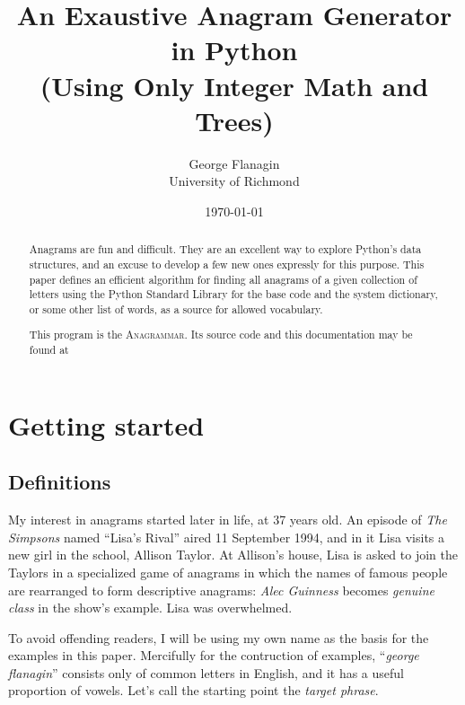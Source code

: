 \documentclass[letterpaper, 11pt]{article}
\title{An Exaustive Anagram Generator in Python\\
\Large \vspace{0.7em} (Using Only Integer Math and Trees)}
\author{George Flanagin\\University of Richmond\\\lit{gflanagin@richmond.edu}}
\date{\today}
\providecommand{\anagrammar}{A\textsc{nagrammar}\xspace}
\begin{document}
\maketitle
\begin{abstract}
Anagrams are fun and difficult. They are an excellent way to explore
Python's data structures, and an excuse to develop a few new ones
expressly for this purpose. This paper defines an efficient algorithm
for finding all anagrams of a given collection of letters using the
Python Standard Library for the base code and the system dictionary,
or some other list of words,
as a source for allowed vocabulary. 

This program is the \anagrammar. Its source code and this documentation
may be found at 

\end{abstract}

\tableofcontents
\listoffigures

\newpage
\pagewiselinenumbers
\section{Getting started}

\subsection{Definitions}
My interest in anagrams started later in life, at 37 years old. An episode of
\emph{The Simpsons} named ``Lisa's Rival'' aired 11 September 1994,
and in it Lisa visits a new girl in the school, Allison
Taylor. At Allison's house, Lisa is asked to join the Taylors in a
specialized game of anagrams in which the names of famous people
are rearranged to form descriptive anagrams: \emph{Alec Guinness}
becomes \emph{genuine class} in the show's example. Lisa was overwhelmed.

To avoid offending readers, I will be using my own name as the basis
for the examples in this paper. Mercifully for the contruction of
examples, ``\emph{george flanagin}'' consists only of common letters
in English, and it has a useful proportion of vowels. Let's call
the starting point the \emph{target phrase}.
\end{document}
